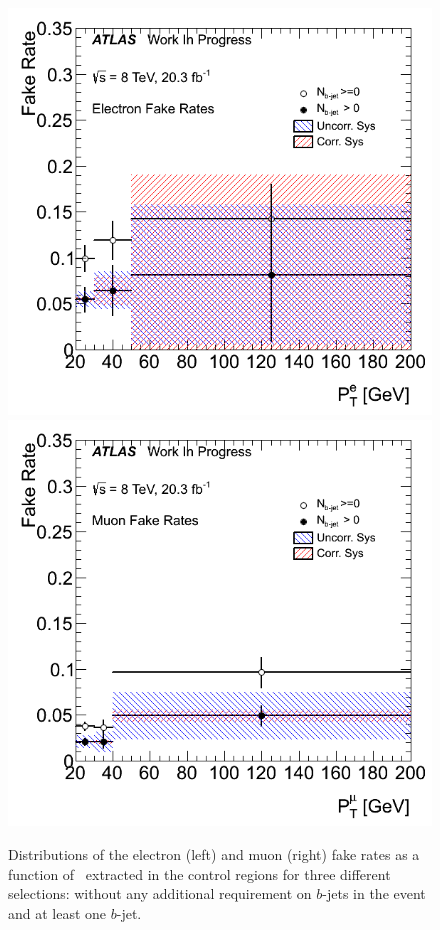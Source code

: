 







\begin{figure}[ht!]
\centering
\includegraphics[width=0.45\columnwidth]{figures/fakes_bkg/Efficiencies/ElectronFakeRates.png}
\includegraphics[width=0.45\columnwidth]{figures/fakes_bkg/Efficiencies/MuonFakeRates.png}
\caption{Distributions of the electron (left) and muon (right) fake rates as a function of \pt\ extracted in the control regions for three different selections: without any additional requirement on $b$-jets in the event and at least one $b$-jet.}
\label{fig:fakeEff}
\end{figure}




